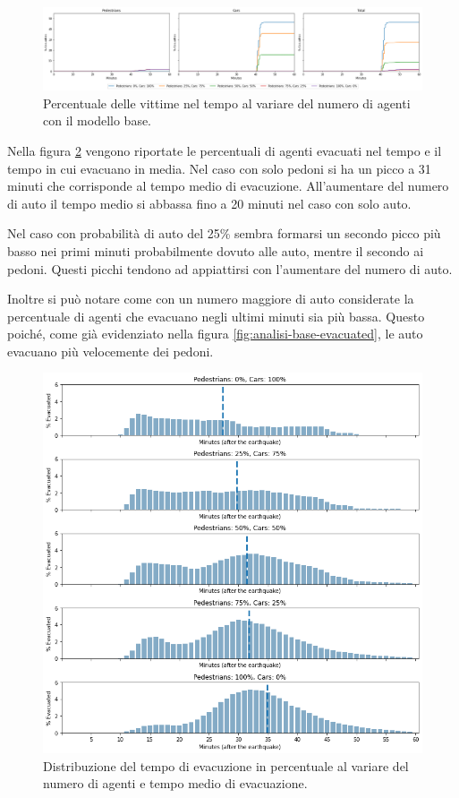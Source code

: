 \begin{figure}[ht]
    \centering
    \includegraphics[width=\textwidth]{images/analisi/base-casualties.png}
    \caption{
        Percentuale delle vittime nel tempo al variare del numero di agenti con il modello base.
    }
    \label{fig:analisi-base-casualties}
\end{figure}

Nella figura \ref{fig:analisi-base-evtimes} vengono riportate le percentuali di agenti evacuati nel tempo e il tempo in cui evacuano in media.
%
Nel caso con solo pedoni si ha un picco a 31 minuti che corrisponde al tempo medio di evacuzione.
All'aumentare del numero di auto il tempo medio si abbassa fino a 20 minuti nel caso con solo auto.

Nel caso con probabilità di auto del 25\% sembra formarsi un secondo picco più basso nei primi minuti probabilmente dovuto alle auto, mentre il secondo ai pedoni.
Questi picchi tendono ad appiattirsi con l'aumentare del numero di auto.

Inoltre si può notare come con un numero maggiore di auto considerate la percentuale di agenti che evacuano negli ultimi minuti sia più bassa.
Questo poiché, come già evidenziato nella figura \ref{fig:analisi-base-evacuated}, le auto evacuano più velocemente dei pedoni.

\begin{figure}
    \centering
    \includegraphics[width=\textwidth]{images/analisi/base-evtimes.png}
    \caption{
        Distribuzione del tempo di evacuzione in percentuale al variare del numero di agenti e tempo medio di evacuazione.
    }
    \label{fig:analisi-base-evtimes}
\end{figure}

